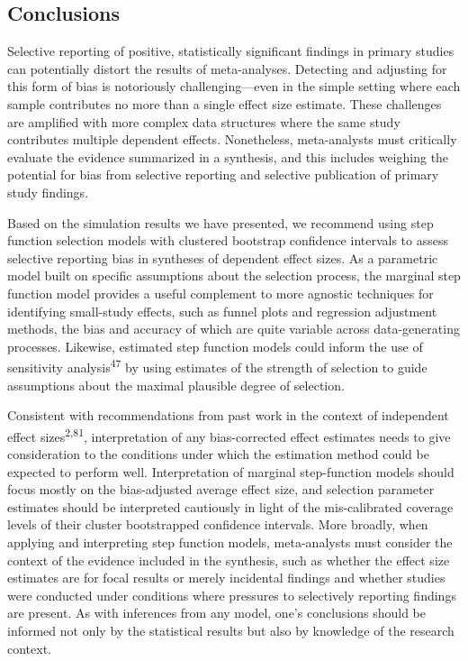\documentclass[
  american,
  man, donotrepeattitle,floatsintext]{apa7}
\begin{document}
\subsection{Conclusions}\label{conclusions}

Selective reporting of positive, statistically significant findings in primary studies can potentially distort the results of meta-analyses.
Detecting and adjusting for this form of bias is notoriously challenging---even in the simple setting where each sample contributes no more than a single effect size estimate.
These challenges are amplified with more complex data structures where the same study contributes multiple dependent effects.
Nonetheless, meta-analysts must critically evaluate the evidence summarized in a synthesis, and this includes weighing the potential for bias from selective reporting and selective publication of primary study findings.

Based on the simulation results we have presented, we recommend using step function selection models with clustered bootstrap confidence intervals to assess selective reporting bias in syntheses of dependent effect sizes. As a parametric model built on specific assumptions about the selection process, the marginal step function model provides a useful complement to more agnostic techniques for identifying small-study effects, such as funnel plots and regression adjustment methods, the bias and accuracy of which are quite variable across data-generating processes. Likewise, estimated step function models could inform the use of sensitivity analysis\textsuperscript{47} by using estimates of the strength of selection to guide assumptions about the maximal plausible degree of selection.

Consistent with recommendations from past work in the context of independent effect sizes\textsuperscript{2,81}, interpretation of any bias-corrected effect estimates needs to give consideration to the conditions under which the estimation method could be expected to perform well.
Interpretation of marginal step-function models should focus mostly on the bias-adjusted average effect size, and selection parameter estimates should be interpreted cautiously in light of the mis-calibrated coverage levels of their cluster bootstrapped confidence intervals.
More broadly, when applying and interpreting step function models, meta-analysts must consider the context of the evidence included in the synthesis, such as whether the effect size estimates are for focal results or merely incidental findings and whether studies were conducted under conditions where pressures to selectively reporting findings are present.
As with inferences from any model, one's conclusions should be informed not only by the statistical results but also by knowledge of the research context.
\end{document}
